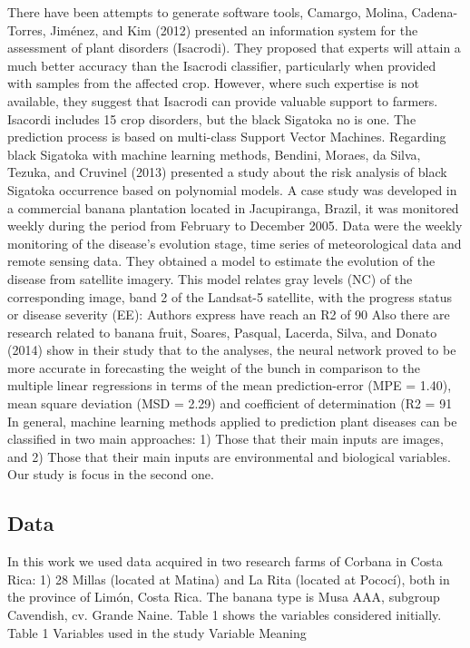 \documentclass[review]{elsarticle}
\begin{document}
There have been attempts to generate software tools, Camargo, Molina, Cadena-Torres, Jiménez, and Kim (2012) presented an information system for the assessment of plant disorders (Isacrodi). They proposed that experts will attain a much better accuracy than the Isacrodi classifier, particularly when provided with samples from the affected crop. However, where such expertise is not available, they suggest that Isacrodi can provide valuable support to farmers. Isacordi includes 15 crop disorders, but the black Sigatoka no is one. The prediction process is based on multi-class Support Vector Machines.
Regarding black Sigatoka with machine learning methods, Bendini, Moraes, da Silva, Tezuka, and Cruvinel (2013) presented a study about the risk analysis of black Sigatoka occurrence based on polynomial models. A case study was developed in a commercial banana plantation located in Jacupiranga, Brazil, it was monitored weekly during the period from February to December 2005. Data were the weekly monitoring of the disease’s evolution stage, time series of meteorological data and remote sensing data. They obtained a model to estimate the evolution of the disease from satellite imagery. This model relates gray levels (NC) of the corresponding image, band 2 of the Landsat-5 satellite, with the progress status or disease severity (EE): Authors express have reach an R2 of 90%
Also there are research related to banana fruit, Soares, Pasqual, Lacerda, Silva, and Donato (2014) show in their study that  to the analyses, the neural network proved to be more accurate in forecasting the weight of the bunch in comparison to the multiple linear regressions in terms of the mean prediction-error (MPE = 1.40), mean square deviation (MSD = 2.29) and coefficient of determination (R2 = 91%
In general, machine learning methods applied to prediction plant diseases can be classified in two main approaches: 1) Those that their main inputs are images, and 2) Those that their main inputs are environmental and biological variables. Our study is focus in the second one.

\subsection{Data}
In this work we used data acquired in two research farms of Corbana in Costa Rica: 1) 28 Millas (located at Matina) and La Rita (located at Pococí), both in the province of Limón, Costa Rica. The banana type is Musa AAA, subgroup Cavendish, cv. Grande Naine. Table 1 shows the variables considered initially.
Table 1 Variables used in the study
Variable	Meaning
%
\end{document}
